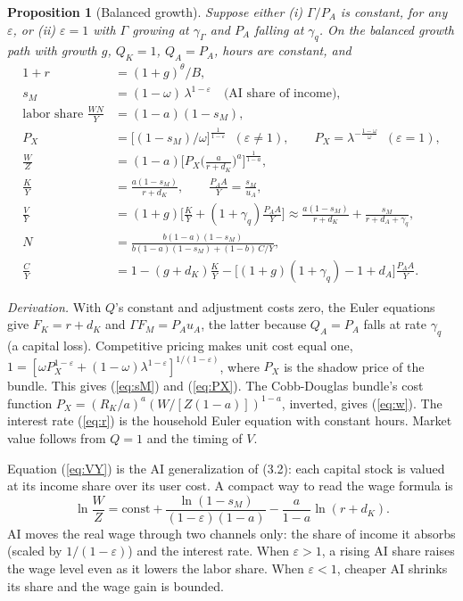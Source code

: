 \documentclass[11pt]{article}
\newtheorem{proposition}{Proposition}
\newcommand{\e}{\varepsilon}
\begin{document}
\begin{proposition}[Balanced growth]\label{prop:bgp}
Suppose either (i) $\Gamma/P_A$ is constant, for any $\e$, or (ii) $\e=1$ with
$\Gamma$ growing at $\gamma_\Gamma$ and $P_A$ falling at $\gamma_q$. On the balanced
growth path with growth $g$, $Q_K=1$, $Q_A=P_A$, hours are constant, and
\begin{align}
1+r &= (1+g)^{\theta}/B, \label{eq:r}\\
s_M &= (1-\omega)\,\lambda^{1-\e} \quad\text{(AI share of income)}, \label{eq:sM}\\
\text{labor share } \tfrac{WN}{Y} &= (1-a)(1-s_M), \label{eq:labsh}\\
P_X &= \big[(1-s_M)/\omega\big]^{\frac{1}{1-\e}} \;\; (\e\neq1), \qquad P_X=\lambda^{-\frac{1-\omega}{\omega}}\;\;(\e=1),\label{eq:PX}\\
\frac{W}{Z} &= (1-a)\Big[P_X\Big(\frac{a}{r+d_K}\Big)^{a}\Big]^{\frac{1}{1-a}}, \label{eq:w}\\
\frac{K}{Y} &= \frac{a(1-s_M)}{r+d_K},\qquad \frac{P_AA}{Y}=\frac{s_M}{u_A},\\
\frac{V}{Y} &= (1+g)\Big[\frac{K}{Y}+(1+\gamma_q)\frac{P_AA}{Y}\Big]
\approx \frac{a(1-s_M)}{r+d_K}+\frac{s_M}{r+d_A+\gamma_q}, \label{eq:VY}\\
N &= \frac{b(1-a)(1-s_M)}{b(1-a)(1-s_M)+(1-b)\,C/Y},\\
\frac CY &= 1-(g+d_K)\frac KY-\big[(1+g)(1+\gamma_q)-1+d_A\big]\frac{P_AA}{Y}.
\end{align}
\end{proposition}

\emph{Derivation.} With $Q$'s constant and adjustment costs zero, the Euler equations
give $F_K=r+d_K$ and $\Gamma F_M=P_Au_A$, the latter because $Q_A=P_A$ falls at rate
$\gamma_q$ (a capital loss). Competitive pricing makes unit cost equal one,
$1=[\omega P_X^{1-\e}+(1-\omega)\lambda^{1-\e}]^{1/(1-\e)}$, where $P_X$ is the shadow
price of the bundle. This gives (\ref{eq:sM}) and (\ref{eq:PX}). The Cobb-Douglas
bundle's cost function $P_X = (R_K/a)^a(W/[Z(1-a)])^{1-a}$, inverted, gives
(\ref{eq:w}). The interest rate (\ref{eq:r}) is the household Euler equation with
constant hours. Market value follows from $Q=1$ and the timing of $V$.

Equation (\ref{eq:VY}) is the AI generalization of (3.2): each capital stock is valued at
its income share over its user cost. A compact way to read the wage formula is
\begin{equation}
\ln\frac{W}{Z} = \text{const} + \frac{\ln(1-s_M)}{(1-\e)(1-a)} - \frac{a}{1-a}\ln(r+d_K).
\label{eq:wlog}
\end{equation}
AI moves the real wage through two channels only: the share of income it absorbs
(scaled by $1/(1-\e)$) and the interest rate. When $\e>1$, a rising AI share raises the
wage level even as it lowers the labor share. When $\e<1$, cheaper AI shrinks its share
and the wage gain is bounded.
\end{document}
